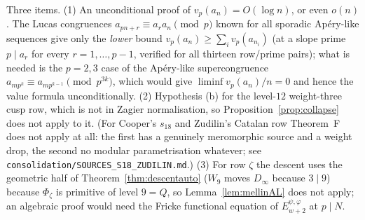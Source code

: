 \begin{remark}\label{rem:remains}
\Open{} Three items.  \textup{(1)} An unconditional proof of
$v_p(a_n)=O(\log n)$, or even $o(n)$.  The Lucas congruences
$a_{pn+r}\equiv a_ra_n\pmod p$ known for all sporadic Ap\'ery-like sequences
give only the \emph{lower} bound $v_p(a_n)\ge\sum_iv_p(a_{n_i})$ (at a slope
prime $p\mid a_r$ for every $r=1,\dots,p-1$, verified for all thirteen
row/prime pairs); what is needed is the $p=2,3$ case of the Ap\'ery-like
supercongruence $a_{mp^k}\equiv a_{mp^{k-1}}\pmod{p^{3k}}$, which would give
$\liminf v_p(a_n)/n=0$ and hence the value formula unconditionally.
\textup{(2)} Hypothesis \textup{(b)} for the level-$12$ weight-three cusp row,
which is not in Zagier normalisation, so Proposition~\ref{prop:collapse} does
not apply to it.  (For Cooper's $s_{18}$ and Zudilin's Catalan row Theorem~F
does not apply at all: the first has a genuinely meromorphic source and a
weight drop, the second no modular parametrisation whatever;
see \texttt{consolidation/SOURCES\_S18\_ZUDILIN.md}.)
\textup{(3)} For row $\zeta$ the descent uses the geometric half of
Theorem~\ref{thm:descentauto} ($W_9$ moves $D_\infty$ because $3\mid9$)
because $\Phi_\zeta$ is primitive of level $9=Q$, so
Lemma~\ref{lem:mellinAL} does not apply; an algebraic proof would need the
Fricke functional equation of $E^{\psi,\varphi}_{w+2}$ at $p\mid N$.
\end{remark}
